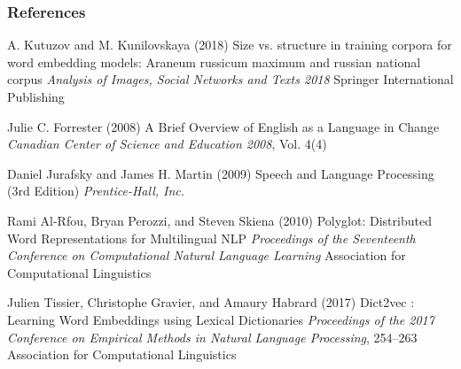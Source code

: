 \begin{frame}
    \frametitle{References}
    \fontsize{8}{4}\selectfont
    \begin{thebibliography}{99} %
         A. Kutuzov and M. Kunilovskaya (2018)
        \newblock Size vs. structure in training corpora
        for word embedding models: Araneum russicum maximum and russian national
        corpus
        \newblock \emph{Analysis of Images, Social Networks and Texts 2018}
        \newblock Springer International Publishing
        
         Julie C. Forrester (2008)
        \newblock A Brief Overview of English as a Language in Change
        \newblock \emph{Canadian Center of Science and Education 2008}, Vol. 4(4) 
    
         Daniel Jurafsky and James H. Martin (2009)
        \newblock Speech and Language Processing (3rd Edition)
        \newblock \emph{Prentice-Hall, Inc.}
    
         Rami Al-Rfou, Bryan Perozzi,
        and Steven Skiena (2010)
        \newblock Polyglot: Distributed Word Representations for Multilingual {NLP}
        \newblock \emph{Proceedings of the Seventeenth Conference on Computational Natural Language Learning}
        \newblock Association for Computational Linguistics
    
         Julien Tissier, Christophe Gravier, and Amaury Habrard (2017)
        \newblock Dict2vec : Learning Word Embeddings using Lexical Dictionaries 
        \newblock \emph{Proceedings of the 2017 Conference on Empirical Methods in Natural Language Processing}, 254--263
        \newblock Association for Computational Linguistics    
    \end{thebibliography}
\end{frame}

    


